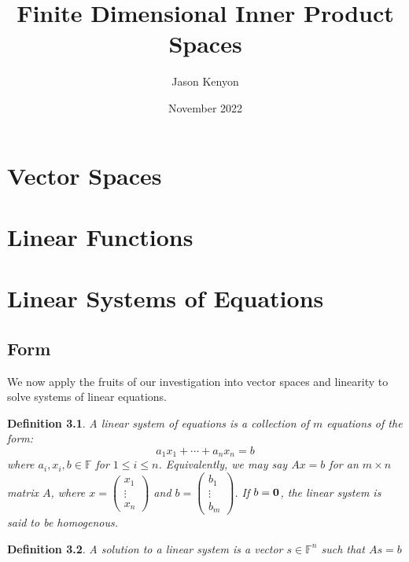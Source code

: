 \documentclass{amsbook}
\title{Finite Dimensional Inner Product Spaces}
\author{Jason Kenyon}
\date{November 2022}
\newtheorem{defn}{Definition}
\begin{document}
\maketitle
\tableofcontents

\chapter{Vector Spaces}

\chapter{Linear Functions}
\chapter{Linear Systems of Equations}
\section*{Form}
We now apply the fruits of our investigation into vector spaces and linearity to solve systems of linear equations.
\begin{defn}
  A linear system of equations is a collection of $m$ equations of the form:
  $$a_{1}x_{1}+ \cdots +a_{n}x_{n}=b$$ where $a_{i}, x_{i},b \in \mathbb{F}$ for $1 \leq i \leq n$. Equivalently, we may say
  $Ax=b$ for an $m \times n$ matrix $A$, where $x= \begin{pmatrix} x_{1} \\ \vdots \\ x_{n}\end{pmatrix}$ and $b= \begin{pmatrix} b_{1} \\ \vdots \\ b_{m}\end{pmatrix}$.
  If $b=\bold{0}$, the linear system is said to be homogenous.
\end{defn}
\begin{defn}
A solution to a linear system is a vector $s \in \mathbb{F}^{n}$ such that $As=b$
\end{defn}
\end{document}
